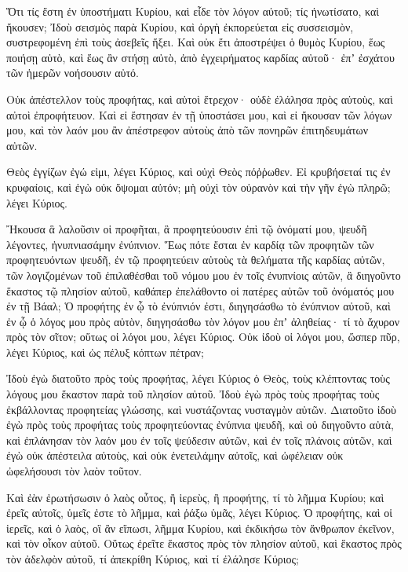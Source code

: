 {Ὅτι τίς ἔστη ἐν ὑποστήματι Κυρίου, καὶ εἶδε τὸν λόγον αὐτοῦ; τίς ἠνωτίσατο, καὶ ἤκουσεν;
Ἰδοὺ σεισμὸς παρὰ Κυρίου, καὶ ὀργὴ ἐκπορεύεται εἰς συσσεισμὸν, συστρεφομένη ἐπὶ τοὺς ἀσεβεῖς ἥξει.
Καὶ οὐκ ἔτι ἀποστρέψει ὁ θυμὸς Κυρίου, ἕως ποιήσῃ αὐτὸ, καὶ ἕως ἂν στήσῃ αὐτὸ, ἀπὸ ἐγχειρήματος καρδίας αὐτοῦ· ἐπʼ ἐσχάτου τῶν ἡμερῶν νοήσουσιν αὐτό.
\par }{\PP {}Οὐκ ἀπέστελλον τοὺς προφήτας, καὶ αὐτοὶ ἔτρεχον· οὐδὲ ἐλάλησα πρὸς αὐτοὺς, καὶ αὐτοὶ ἐπροφήτευον.
Καὶ εἰ ἔστησαν ἐν τῇ ὑποστάσει μου, καὶ εἰ ἤκουσαν τῶν λόγων μου, καὶ τὸν λαόν μου ἂν ἀπέστρεφον αὐτοὺς ἀπὸ τῶν πονηρῶν ἐπιτηδευμάτων αὐτῶν.
\par }{\PP {}Θεὸς ἐγγίζων ἐγώ εἰμι, λέγει Κύριος, καὶ οὐχὶ Θεὸς πόῤῥωθεν.
Εἰ κρυβήσεταί τις ἐν κρυφαίοις, καὶ ἐγὼ οὐκ ὄψομαι αὐτόν; μὴ οὐχὶ τὸν οὐρανὸν καὶ τὴν γῆν ἐγὼ πληρῶ; λέγει Κύριος.
\par }{\PP {}Ἤκουσα ἃ λαλοῦσιν οἱ προφῆται, ἃ προφητεύουσιν ἐπὶ τῷ ὀνόματί μου, ψευδῆ λέγοντες, ἠνυπνιασάμην ἐνύπνιον.
Ἕως πότε ἔσται ἐν καρδίᾳ τῶν προφητῶν τῶν προφητευόντων ψευδῆ, ἐν τῷ προφητεύειν αὐτοὺς τὰ θελήματα τῆς καρδίας αὐτῶν,
τῶν λογιζομένων τοῦ ἐπιλαθέσθαι τοῦ νόμου μου ἐν τοῖς ἐνυπνίοις αὐτῶν, ἃ διηγοῦντο ἕκαστος τῷ πλησίον αὐτοῦ, καθάπερ ἐπελάθοντο οἱ πατέρες αὐτῶν τοῦ ὀνόματός μου ἐν τῇ Βάαλ;
Ὁ προφήτης ἐν ᾧ τὸ ἐνύπνιόν ἐστι, διηγησάσθω τὸ ἐνύπνιον αὐτοῦ, καὶ ἐν ᾧ ὁ λόγος μου πρὸς αὐτὸν, διηγησάσθω τὸν λόγον μου ἐπʼ ἀληθείας· τί τὸ ἄχυρον πρὸς τὸν σῖτον; οὕτως οἱ λόγοι μου, λέγει Κύριος.
Οὐκ ἰδοὺ οἱ λόγοι μου, ὥσπερ πῦρ, λέγει Κύριος, καὶ ὡς πέλυξ κόπτων πέτραν;
\par }{\PP {}Ἰδοὺ ἐγὼ διατοῦτο πρὸς τοὺς προφήτας, λέγει Κύριος ὁ Θεὸς, τοὺς κλέπτοντας τοὺς λόγους μου ἕκαστον παρὰ τοῦ πλησίον αὐτοῦ.
Ἰδοὺ ἐγὼ πρὸς τοὺς προφήτας τοὺς ἐκβάλλοντας προφητείας γλώσσης, καὶ νυστάζοντας νυσταγμὸν αὐτῶν.
Διατοῦτο ἰδοὺ ἐγὼ πρὸς τοὺς προφήτας τοὺς προφητεύοντας ἐνύπνια ψευδῆ, καὶ οὐ διηγοῦντο αὐτὰ, καὶ ἐπλάνησαν τὸν λαόν μου ἐν τοῖς ψεύδεσιν αὐτῶν, καὶ ἐν τοῖς πλάνοις αὐτῶν, καὶ ἐγὼ οὐκ ἀπέστειλα αὐτοὺς, καὶ οὐκ ἐνετειλάμην αὐτοῖς, καὶ ὠφέλειαν οὐκ ὠφελήσουσι τὸν λαὸν τοῦτον.
\par }{\PP {}Καὶ ἐὰν ἐρωτήσωσιν ὁ λαὸς οὗτος, ἢ ἱερεὺς, ἢ προφήτης, τί τὸ λῆμμα Κυρίου; καὶ ἐρεῖς αὐτοῖς, ὑμεῖς ἐστε τὸ λῆμμα, καὶ ῥάξω ὑμᾶς, λέγει Κύριος.
Ὁ προφήτης, καὶ οἱ ἱερεῖς, καὶ ὁ λαὸς, οἳ ἂν εἴπωσι, λῆμμα Κυρίου, καὶ ἐκδικήσω τὸν ἄνθρωπον ἐκεῖνον, καὶ τὸν οἶκον αὐτοῦ.
Οὕτως ἐρεῖτε ἕκαστος πρὸς τὸν πλησίον αὐτοῦ, καὶ ἕκαστος πρὸς τὸν ἀδελφὸν αὐτοῦ, τί ἀπεκρίθη Κύριος, καὶ τί ἐλάλησε Κύριος;
}
